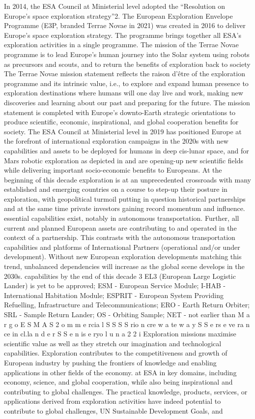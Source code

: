 \documentclass[12pt]{article}
\begin{document}
In 2014, the ESA Council at Ministerial level adopted the “Resolution on Europe’s space exploration strategy”2. The European Exploration Envelope Programme (E3P, branded Terrae Novae in 2021) was created in 2016 to deliver Europe’s space exploration strategy. The programme brings together all ESA’s exploration activities in a single programme. The mission of the Terrae Novae programme is to lead Europe’s human journey into the Solar system using robots as precursors and scouts, and to return the benefits of exploration back to society The Terrae Novae mission statement reflects the raison d’être of the exploration programme and its intrinsic value, i.e., to explore and expand human presence to exploration destinations where humans will one day live and work, making new discoveries and learning about our past and preparing for the future. The mission statement is completed with Europe’s downto-Earth strategic orientations to produce scientific, economic, inspirational, and global cooperation benefits for society. The ESA Council at Ministerial level in 2019 has positioned Europe at the forefront of international exploration campaigns in the 2020s with new capabilities and assets to be deployed for humans in deep cis-lunar space, and for Mars robotic exploration as depicted in and are opening-up new scientific fields while delivering important socio-economic benefits to Europeans. At the beginning of this decade exploration is at an unprecedented crossroads with many established and emerging countries on a course to step-up their posture in exploration, with geopolitical turmoil putting in question historical partnerships and at the same time private investors gaining record momentum and influence. essential capabilities exist, notably in autonomous transportation. Further, all current and planned European assets are contributing to and operated in the context of a partnership. This contrasts with the autonomous transportation capabilities and platforms of International Partners (operational and/or under development). Without new European exploration developments matching this trend, unbalanced dependencies will increase as the global scene develops in the 2030s. capabilities by the end of this decade 3 EL3 (European Large Logistic Lander) is yet to be approved; ESM - European Service Module; I-HAB - International Habitation Module; ESPRIT - European System Providing Refuelling, Infrastructure and Telecommunications; ERO - Earth Return Orbiter; SRL - Sample Return Lander; OS - Orbiting Sample; NET - not earlier than M a r g o E S M A S 2 o m m e rcia l S S S S rio n cre w a te w a y S S e rs e ve ra n ce in cl.la n d e r S S e n is e ryo l u n a 2 2 i Exploration missions maximise scientific value as well as they stretch our imagination and technological capabilities. Exploration contributes to the competitiveness and growth of European industry by pushing the frontiers of knowledge and enabling applications in other fields of the economy. at ESA in key domains, including economy, science, and global cooperation, while also being inspirational and contributing to global challenges. The practical knowledge, products, services, or applications derived from exploration activities have indeed potential to contribute to global challenges, UN Sustainable Development Goals, and 
\end{document}
